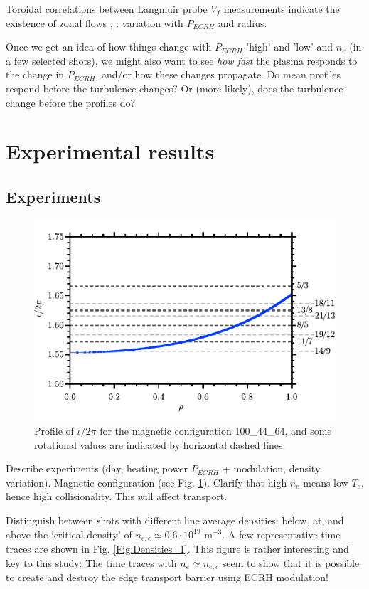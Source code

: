 \documentclass[preprint,12pt,authoryear]{elsarticle}
\begin{document}
Toroidal correlations between Langmuir probe $V_f$ measurements indicate the existence of zonal flows \cite{Pedrosa:2008}, \cite{Milligen:2015}: variation with $P_{ECRH}$ and radius.

Once we get an idea of how things change with $P_{ECRH}$ 'high' and 'low' and $n_e$ (in a few selected shots), we might also want to see {\em how fast} the plasma responds to the change in $P_{ECRH}$, and/or how these changes propagate. Do mean profiles respond before the turbulence changes? Or (more likely), does the turbulence change before the profiles do? 

\section{Experimental results}

\subsection{Experiments}


\begin{figure}[!ht]
   \includegraphics[width=264 pt]{Images/Figure1.pdf}
   \caption{Profile of $\iota/2\pi$ for the magnetic configuration 100\_44\_64, and some rotational values are indicated by horizontal dashed lines.}
   \label{Fig:Figure1}
\end{figure}

Describe experiments (day, heating power $P_{ECRH}$ +  modulation, density variation). Magnetic configuration (see Fig. \ref{Fig:Figure1}).
Clarify that high $n_e$ means low $T_e$, hence high collisionality. This will affect transport.

Distinguish between shots with different line average densities: below, at, and above the `critical density' of $n_{e,c} \simeq 0.6 \cdot 10^{19}$ m$^{-3}$.
A few representative time traces are shown in Fig. \ref{Fig:Densities_1}.
This figure is rather interesting and key to this study: The time traces with $n_e \simeq n_{e,c}$ seem to show that it is possible to create and destroy the edge transport barrier using ECRH modulation!
\end{document}
